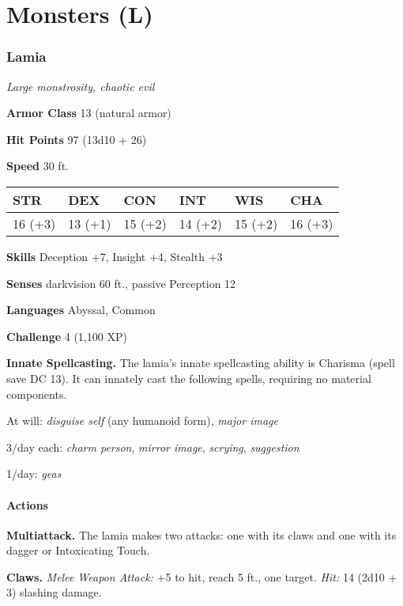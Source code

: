 \documentclass[
]{article}
\date{}
\begin{document}
\hypertarget{monsters-l}{%
\section{Monsters (L)}\label{monsters-l}}

\hypertarget{lamia}{%
\subsubsection{Lamia}\label{lamia}}

\emph{Large monstrosity, chaotic evil}

\textbf{Armor Class} 13 (natural armor)

\textbf{Hit Points} 97 (13d10 + 26)

\textbf{Speed} 30 ft.

\begin{longtable}[]{@{}llllll@{}}
\toprule
STR & DEX & CON & INT & WIS & CHA\tabularnewline
\midrule
\endhead
16 (+3) & 13 (+1) & 15 (+2) & 14 (+2) & 15 (+2) & 16 (+3)\tabularnewline
\bottomrule
\end{longtable}

\textbf{Skills} Deception +7, Insight +4, Stealth +3

\textbf{Senses} darkvision 60 ft., passive Perception 12

\textbf{Languages} Abyssal, Common

\textbf{Challenge} 4 (1,100 XP)

\textbf{Innate Spellcasting.} The lamia's innate spellcasting ability is
Charisma (spell save DC 13). It can innately cast the following spells,
requiring no material components.

At will: \emph{disguise self} (any humanoid form), \emph{major image}

3/day each: \emph{charm person}, \emph{mirror image}, \emph{scrying},
\emph{suggestion}

1/day: \emph{geas}

\hypertarget{actions}{%
\paragraph{Actions}\label{actions}}

\textbf{Multiattack.} The lamia makes two attacks: one with its claws
and one with its dagger or Intoxicating Touch.

\textbf{Claws.} \emph{Melee Weapon Attack:} +5 to hit, reach 5 ft., one
target. \emph{Hit:} 14 (2d10 + 3) slashing damage.
\end{document}
